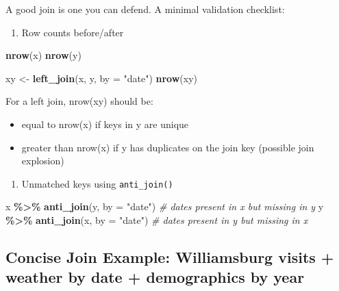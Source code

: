 \documentclass[
  11pt,
]{article}
\newenvironment{Shaded}{\begin{snugshade}}{\end{snugshade}}
\newcommand{\AttributeTok}[1]{\textcolor[rgb]{0.13,0.29,0.53}{#1}}
\newcommand{\CommentTok}[1]{\textcolor[rgb]{0.56,0.35,0.01}{\textit{#1}}}
\newcommand{\FunctionTok}[1]{\textcolor[rgb]{0.13,0.29,0.53}{\textbf{#1}}}
\newcommand{\NormalTok}[1]{#1}
\newcommand{\OtherTok}[1]{\textcolor[rgb]{0.56,0.35,0.01}{#1}}
\newcommand{\SpecialCharTok}[1]{\textcolor[rgb]{0.81,0.36,0.00}{\textbf{#1}}}
\newcommand{\StringTok}[1]{\textcolor[rgb]{0.31,0.60,0.02}{#1}}
\providecommand{\tightlist}{%
  \setlength{\itemsep}{0pt}\setlength{\parskip}{0pt}}
\begin{document}
A good join is one you can defend. A minimal validation checklist:

\begin{enumerate}
\def\labelenumi{\arabic{enumi}.}
\tightlist
\item
  Row counts before/after
\end{enumerate}

\begin{Shaded}
\begin{Highlighting}[]
\FunctionTok{nrow}\NormalTok{(x)}
\FunctionTok{nrow}\NormalTok{(y)}

\NormalTok{xy }\OtherTok{\textless{}{-}} \FunctionTok{left\_join}\NormalTok{(x, y, }\AttributeTok{by =} \StringTok{"date"}\NormalTok{)}
\FunctionTok{nrow}\NormalTok{(xy)}
\end{Highlighting}
\end{Shaded}

For a left join, nrow(xy) should be:

\begin{itemize}
\tightlist
\item
  equal to nrow(x) if keys in y are unique
\item
  greater than nrow(x) if y has duplicates on the join key (possible
  join explosion)
\end{itemize}

\begin{enumerate}
\def\labelenumi{\arabic{enumi}.}
\setcounter{enumi}{1}
\tightlist
\item
  Unmatched keys using \texttt{anti\_join()}
\end{enumerate}

\begin{Shaded}
\begin{Highlighting}[]
\NormalTok{x }\SpecialCharTok{\%\textgreater{}\%} \FunctionTok{anti\_join}\NormalTok{(y, }\AttributeTok{by =} \StringTok{"date"}\NormalTok{)   }\CommentTok{\# dates present in x but missing in y}
\NormalTok{y }\SpecialCharTok{\%\textgreater{}\%} \FunctionTok{anti\_join}\NormalTok{(x, }\AttributeTok{by =} \StringTok{"date"}\NormalTok{)   }\CommentTok{\# dates present in y but missing in x}
\end{Highlighting}
\end{Shaded}

\subsection{Concise Join Example: Williamsburg visits + weather by date
+ demographics by
year}\label{concise-join-example-williamsburg-visits-weather-by-date-demographics-by-year}
\end{document}
